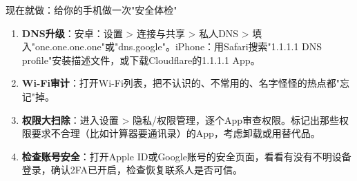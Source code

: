\begin{tcbpractice}{现在就做：给你的手机做一次"安全体检"}
\begin{enumerate}
  \item \textbf{DNS升级}：安卓：设置 > 连接与共享 > 私人DNS > 填入"one.one.one.one"或"dns.google"。iPhone：用Safari搜索"1.1.1.1 DNS profile"安装描述文件，或下载Cloudflare的1.1.1.1 App。
  \item \textbf{Wi-Fi审计}：打开Wi-Fi列表，把不认识的、不常用的、名字怪怪的热点都"忘记"掉。
  \item \textbf{权限大扫除}：进入设置 > 隐私/权限管理，逐个App审查权限。标记出那些权限要求不合理（比如计算器要通讯录）的App，考虑卸载或用替代品。
  \item \textbf{检查账号安全}：打开Apple ID或Google账号的安全页面，看看有没有不明设备登录，确认2FA已开启，检查恢复联系人是否可信。
\end{enumerate}

\end{tcbpractice}
